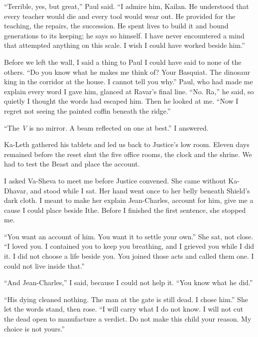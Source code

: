 ``Terrible, yes, but great,'' Paul said. ``I admire him, Kailan. He understood that every teacher would die and every tool would wear out. He provided for the teaching, the repairs, the succession. He spent lives to build it and bound generations to its keeping; he says so himself. I have never encountered a mind that attempted anything on this scale. I wish I could have worked beside him.''\par

\ornament

Before we left the wall, I said a thing to Paul I could have said to none of the others. ``Do you know what he makes me think of? Your Basquiat. The dinosaur king in the corridor at the house. I cannot tell you why.'' Paul, who had made me explain every word I gave him, glanced at Ravar's final line. ``No. Ra,'' he said, so quietly I thought the words had escaped him. Then he looked at me. ``Now I regret not seeing the painted coffin beneath the ridge.''\par

``The \textit{V} is no mirror. A beam reflected on one at best.'' I answered.\par

Ka-Leth gathered his tablets and led us back to Justice's low room. Eleven days remained before the reset shut the five office rooms, the clock and the shrine. We had to test the Beast and place the account.\par

\ornament

I asked Va-Sheva to meet me before Justice convened. She came without Ka-Dhavar, and stood while I sat. Her hand went once to her belly beneath Shield's dark cloth. I meant to make her explain Jean-Charles, account for him, give me a cause I could place beside Ithe. Before I finished the first sentence, she stopped me.\par

\ornament

``You want an account of him. You want it to settle your own.'' She sat, not close. ``I loved you. I contained you to keep you breathing, and I grieved you while I did it. I did not choose a life beside you. You joined those acts and called them one. I could not live inside that.''\par

``And Jean-Charles,'' I said, because I could not help it. ``You know what he did.''\par

``His dying cleaned nothing. The man at the gate is still dead. I chose him.'' She let the words stand, then rose. ``I will carry what I do not know. I will not cut the dead open to manufacture a verdict. Do not make this child your reason. My choice is not yours.''\par

